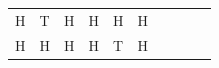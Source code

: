 {\begin{center}
\begin{xtabular*}{\mytablewidth}[t]{|p{10\mystarwidth}|p{10\mystarwidth}|p{10\mystarwidth}|p{10\mystarwidth}|p{10\mystarwidth}|p{10\mystarwidth}|p{10\mystarwidth}|p{10\mystarwidth}|p{10\mystarwidth}|p{10\mystarwidth}|}
        H &
        T &
        H &
        H &
        H &
        H%
     \tabularnewline{}
        H &
        H &
        H &
        H &
        T &
        H &

\end{xtabular*}
\end{center}}

